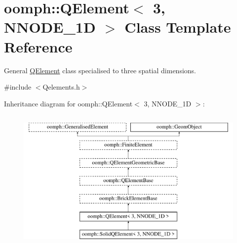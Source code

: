 \hypertarget{classoomph_1_1QElement_3_013_00_01NNODE__1D_01_4}{}\section{oomph\+:\+:Q\+Element$<$ 3, N\+N\+O\+D\+E\+\_\+1D $>$ Class Template Reference}
\label{classoomph_1_1QElement_3_013_00_01NNODE__1D_01_4}


General \hyperlink{classoomph_1_1QElement}{Q\+Element} class specialised to three spatial dimensions.  




{\ttfamily \#include $<$Qelements.\+h$>$}

Inheritance diagram for oomph\+:\+:Q\+Element$<$ 3, N\+N\+O\+D\+E\+\_\+1D $>$\+:\begin{figure}[H]
\begin{center}
\leavevmode
\includegraphics[height=7.000000cm]{classoomph_1_1QElement_3_013_00_01NNODE__1D_01_4}
\end{center}
\end{figure}
